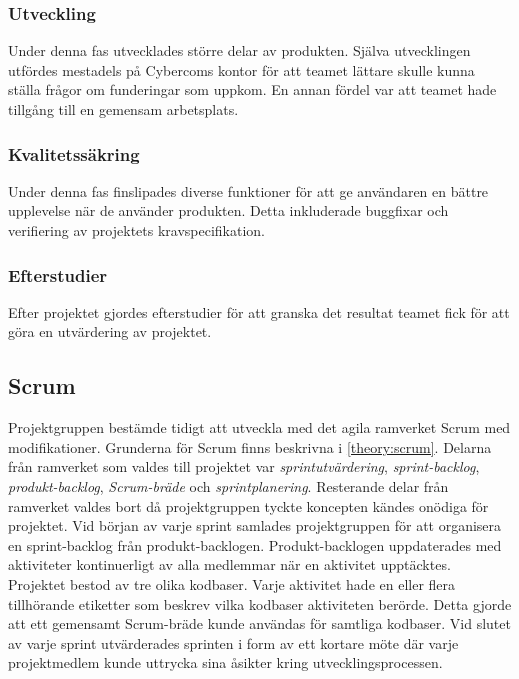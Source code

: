 \subsubsection*{Utveckling}
Under denna fas utvecklades större delar av produkten. Själva utvecklingen utfördes mestadels på Cybercoms kontor för att teamet lättare skulle kunna ställa frågor om funderingar som uppkom. En annan fördel var att teamet hade tillgång till en gemensam arbetsplats.

\subsubsection*{Kvalitetssäkring}
Under denna fas finslipades diverse funktioner för att ge användaren en bättre upplevelse när de använder produkten. Detta inkluderade buggfixar och verifiering av projektets kravspecifikation.

\subsubsection*{Efterstudier}
Efter projektet gjordes efterstudier för att granska det resultat teamet fick för att göra en utvärdering av projektet.

\subsection{Scrum}
\label{main:Scrum}
Projektgruppen bestämde tidigt att utveckla med det agila ramverket Scrum med modifikationer. Grunderna för Scrum finns beskrivna i \ref{theory:scrum}. Delarna från ramverket som valdes till projektet var \textit{sprintutvärdering}, \textit{sprint-backlog}, \textit{produkt-backlog}, \textit{Scrum-bräde} och \textit{sprintplanering}. Resterande delar från ramverket valdes bort då projektgruppen tyckte koncepten kändes onödiga för projektet. Vid början av varje sprint samlades projektgruppen för att organisera en sprint-backlog från produkt-backlogen. Produkt-backlogen uppdaterades med aktiviteter kontinuerligt av alla medlemmar när en aktivitet upptäcktes. Projektet bestod av tre olika kodbaser. Varje aktivitet hade en eller flera tillhörande etiketter som beskrev vilka kodbaser aktiviteten berörde. Detta gjorde att ett gemensamt Scrum-bräde kunde användas för samtliga kodbaser. Vid slutet av varje sprint utvärderades sprinten i form av ett kortare möte där varje projektmedlem kunde uttrycka sina åsikter kring utvecklingsprocessen.

